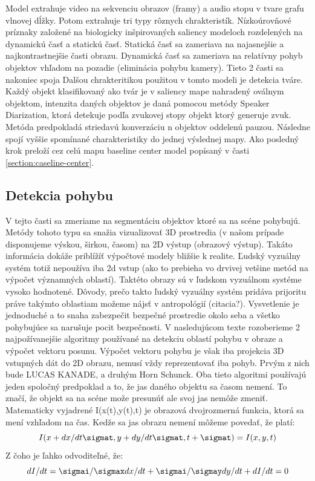 Model extrahuje video na sekvenciu obrazov (framy) a audio stopu v tvare grafu vlnovej dĺžky.
Potom extrahuje tri typy rôznych chrakteristík.
Nízkoúrovňové príznaky založené na biologicky inšpirovaných saliency modeloch rozdelených na dynamickú časť a statickú časť.
Statická časť sa zameriava na najasnejšie a najkontrastnejšie časti obrazu.
Dynamická časť sa zameriava na relatívny pohyb objektov vhľadom na pozadie (eliminácia pohybu kamery).
Tieto 2 časti sa nakoniec spoja
Dalšou chrakteritikou použitou v tomto modeli je detekcia tváre.
Každý objekt klasifikovaný ako tvár je v saliency mape nahradený oválnym objektom, intenzita daných objektov je daná pomocou metódy Speaker Diarization, ktorá detekuje podľa zvukovej stopy objekt ktorý generuje zvuk.
Metóda predpokladá striedavú konverzáciu n objektov oddelenú pauzou.
Následne spojí vyššie spomínané charakteristiky do jednej výslednej mapy.
Ako posledný krok preloží cez celú mapu baseline center model popísaný v časti \ref{section:caseline-center}.

\subsection{Detekcia pohybu}
V tejto časti sa zmeriame na segmentáciu objektov ktoré sa na scéne pohybujú.
Metódy tohoto typu sa snažia vizualizovať 3D prostredia (v našom prípade disponujeme výskou, širkou, časom) na 2D výstup (obrazový výstup).
Takáto informácia dokáže priblížíť výpočtové modely bližšie k realite.
Ľudský vyzuálny systém totiž nepoužíva iba 2d vstup (ako to prebieha vo drvivej vetšine metód na výpočet významných oblastí).
Taktéto obrazy sú v ľudskom vyzuálnom systéme vysoko hodnotené.
Dôvody, prečo takto ľudský vyzuálny systém pridáva prijoritu práve takýmto oblastiam možeme nájsť v antropológií (citacia?).
Vysvetlenie je jednoduché a to snaha zabezpečit bezpečné prostredie okolo seba a všetko pohybujúce sa narušuje pocit bezpečnosti.
V nasledujúcom texte rozoberieme 2 najpožívanejšie algoritmy používané na detekciu oblastí pohybu v obraze a výpočet vektoru posunu.
Výpočet vektoru pohybu je však iba projekcia 3D vstupných dát do 2D obrazu, nemusí vždy reprezentovať iba pohyb.
Prvým z nich bude LUCAS KANADE\cite{lucas-kanade}, a druhým Horn Schunck\cite{horn-schunck}.
Oba tieto algoritmi používajú jeden spoločný predpoklad a to, že jas daného objektu sa časom nemení.
To značí, že objekt sa na scéne može presunúť  ale svoj jas nemôže zmeniť.
Matematicky vyjadrené I(x(t),y(t),t) je obrazová dvojrozmerná funkcia, ktorá sa mení vzhľadom na čas.
Kedže sa jas obrazu nemení môžeme povedať, že platí:
\begin{equation}
  I(x + dx/dt \sigmat ,y + dy/dt \sigmat, t + \sigmat) = I(x,y,t)
\end{equation}
Z čoho je ľahko odvoditeľné, že:
\begin{equation}
  dI/dt = \sigmai/\sigmax dx/dt + \sigmai/\sigmay dy/dt + dI/dt  =  0
\end{equation}

